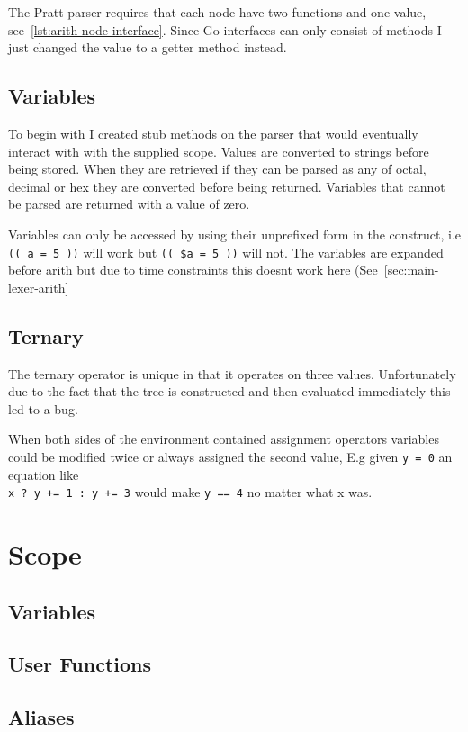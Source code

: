 The Pratt parser requires that each node have two functions and one value, see~\ref{lst:arith-node-interface}.
Since Go interfaces can only consist of methods I just changed the value to a getter method instead.

\subsection{Variables}
To begin with I created stub methods on the parser that would eventually interact with with the supplied scope.
Values are converted to strings before being stored.
When they are retrieved if they can be parsed as any of octal, decimal or hex they are converted before being returned.
Variables that cannot be parsed are returned with a value of zero.

Variables can only be accessed by using their unprefixed form in the construct, i.e \verb!(( a = 5 ))! will work but \verb!(( $a = 5 ))! will not.
The variables are expanded before arith but due to time constraints this doesnt work here (See~\ref{sec:main-lexer-arith}
\subsection{Ternary}
The ternary operator is unique in that it operates on three values.
Unfortunately due to the fact that the tree is constructed and then evaluated immediately this led to a bug.

When both sides of the environment contained assignment operators variables could be modified twice or always assigned the second value, E.g given \verb!y = 0! an equation like \\ \verb!x ? y += 1 : y += 3! would make \verb!y == 4! no matter what x was.

\section{Scope}
\label{sec:scope}

\subsection{Variables}
\subsection{User Functions}
\subsection{Aliases}

